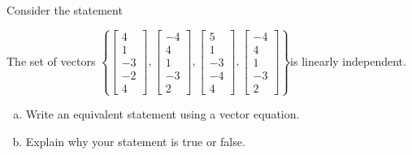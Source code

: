 
\begin{exerciseStatement}


Consider the statement 
\begin{center}\begin{minipage}{0.8\textwidth}
 The set of vectors \( \left\{ \left[\begin{array}{c}
4 \\
1 \\
-3 \\
-2 \\
4
\end{array}\right] , \left[\begin{array}{c}
-4 \\
4 \\
1 \\
-3 \\
2
\end{array}\right] , \left[\begin{array}{c}
5 \\
1 \\
-3 \\
-4 \\
4
\end{array}\right] , \left[\begin{array}{c}
-4 \\
4 \\
1 \\
-3 \\
2
\end{array}\right] \right\} \)is linearly independent.
\end{minipage}\end{center}
    


\begin{enumerate}[(a)]
\item  Write an equivalent statement using a vector equation.
\item  Explain why your statement is true or false.
\end{enumerate}
    
\end{exerciseStatement}
    
